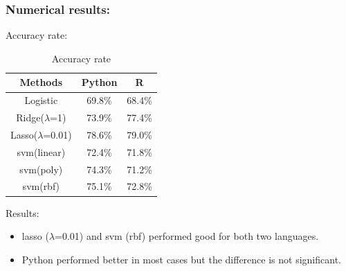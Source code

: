 \documentclass{beamer}
\begin{document}
\begin{frame}
\frametitle{Numerical results:}

\begin{block}{Accuracy rate:}
\begin{table}[h!]\large
  \caption{Accuracy rate}
\begin{center}
    \begin{tabular}{| c | c| c | }
    \hline
    Methods& Python &  R\\
    \hline
Logistic  &69.8\%&	68.4\%\\
Ridge($\lambda$=1)&73.9\%	&77.4\%\\
Lasso($\lambda$=0.01)&78.6\%&	79.0\%\\
svm(linear)&72.4\%	&71.8\%\\
svm(poly)&74.3\%&	71.2\%\\
svm(rbf)&75.1\%	&72.8\%\\
\hline
\end{tabular}
\end{center}
\end{table}
\end{block}

\begin{block}{Results:}
\begin{itemize}
        \item lasso ($\lambda$=0.01) and svm (rbf) performed good for both two languages. 
        \item Python performed better in most cases but the difference is not significant.
    \end{itemize}

\end{block}
\end{frame}
\end{document}
